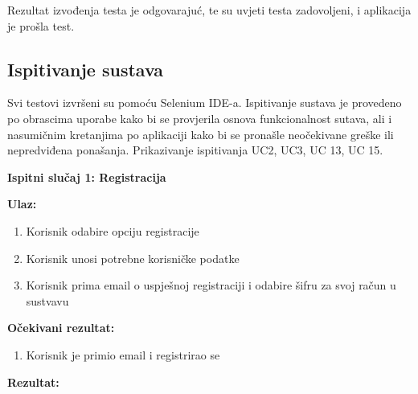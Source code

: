 		Rezultat izvođenja testa je odgovarajuć, te su uvjeti testa zadovoljeni, i aplikacija je prošla test.
		
		\pagebreak
			
			
			\subsection{Ispitivanje sustava}
			
			Svi testovi izvršeni su pomoću Selenium IDE-a. Ispitivanje sustava je provedeno po obrascima uporabe kako bi se provjerila osnova funkcionalnost sutava, ali i nasumičnim kretanjima po aplikaciji kako bi se pronašle neočekivane greške ili nepredviđena ponašanja. Prikazivanje ispitivanja UC2, UC3, UC 13, UC 15.
			
			\textbf{}
			
			\textbf{Ispitni slučaj 1: Registracija}
			
			\textbf{Ulaz:}
			\begin{enumerate}
			    \item Korisnik odabire opciju registracije
			    \item Korisnik unosi potrebne korisničke podatke
			    \item Korisnik prima email o uspješnoj registraciji i odabire šifru za svoj račun u sustvavu
			\end{enumerate}
			
			\textbf{Očekivani rezultat:}
			
			\begin{enumerate}
			    \item Korisnik je primio email i registrirao se
			\end{enumerate}
			
			\textbf{Rezultat:} 
			
